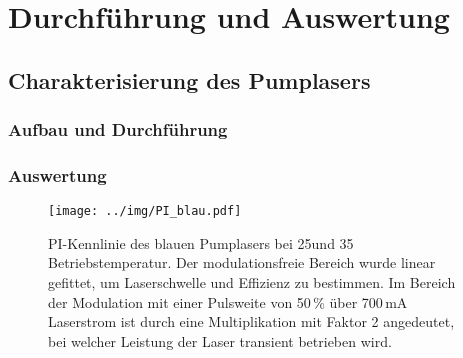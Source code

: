 \section{Durchführung und Auswertung}

\subsection{Charakterisierung des Pumplasers}



\subsubsection{Aufbau und Durchführung}

\subsubsection{Auswertung}

\begin{figure}[H]
\begin{center}
  \texttt{[image: ../img/PI\_blau.pdf]}
  \caption{PI-Kennlinie des blauen Pumplasers bei 25\grad und 35\grad
  Betriebstemperatur. Der modulationsfreie Bereich wurde linear gefittet, um
  Laserschwelle und Effizienz zu bestimmen. Im Bereich der Modulation mit einer
  Pulsweite von 50\,\% über 700\,mA Laserstrom ist durch eine
  Multiplikation mit Faktor 2 angedeutet, bei welcher Leistung der Laser
  transient betrieben wird.}
  \label{img:PI_blau}
\end{center}

\end{figure}

 